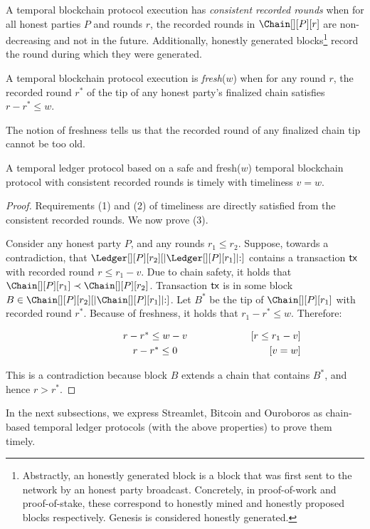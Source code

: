 \begin{definition}
  A temporal blockchain protocol execution has \emph{consistent recorded rounds}
  when for all honest parties $P$ and rounds $r$,
  the recorded rounds in $\Chain[][P][r]$ are non-decreasing and not
  in the future.
  Additionally, honestly generated blocks\footnote{
    Abstractly, an honestly generated block is a block that was first
    sent to the network by an honest party broadcast. Concretely, in proof-of-work
    and proof-of-stake, these correspond to honestly mined and honestly
    proposed blocks respectively. Genesis is considered honestly generated.
  } record the round during which
  they were generated.
\end{definition}

\begin{definition}[Freshness] \label{def:tip-freshness}
  A temporal blockchain protocol execution is \emph{fresh}($w$) when for
  any round $r$, the recorded round
  $r^*$ of the tip of any honest party's finalized chain
  satisfies $r - r^* \leq w$.
\end{definition}

The notion of freshness tells us that the recorded round
of any finalized chain tip cannot be too old.

\begin{theorem} \label{thm:freshness-to-timeliness}
  A temporal ledger protocol based on a safe and fresh($w$)
  temporal blockchain protocol with consistent recorded rounds is timely with timeliness $v = w$.
\end{theorem}
\begin{proof}
  Requirements (1) and (2) of timeliness are directly satisfied from
  the consistent recorded rounds.
  We now prove (3).

  Consider any honest party $P$, and any rounds $r_1 \leq r_2$.
  Suppose, towards a contradiction, that $\Ledger[][P][r_2][|\Ledger[][P][r_1]|{:}]$
  contains a transaction $\textsf{tx}$ with recorded round $r \leq r_1 - v$.
  Due to chain safety, it holds that $\Chain[][P][r_1] \prec \Chain[][P][r_2]$.
  Transaction $\textsf{tx}$ is in some block $B \in \Chain[][P][r_2][|\Chain[][P][r_1]|{:}]$.
  Let $B^*$ be the tip of $\Chain[][P][r_1]$ with recorded round $r^*$.
  Because of freshness, it holds that $r_1 - r^* \leq w$.
  Therefore:

  \begin{align*}
    \makebox[0.5\textwidth][c]{$r - r^* \leq w - v$}         && \text{[$r \leq r_1 - v$]} \\
    \makebox[0.5\textwidth][c]{$r - r^* \leq 0$}             && \text{[$v = w$]}
  \end{align*}

  This is a contradiction because block $B$ extends a chain that contains $B^*$,
  and hence $r > r^*$.
  \Qed
\end{proof}

In the next subsections, we express Streamlet, Bitcoin and Ouroboros
as chain-based temporal ledger protocols (with the above properties) to
prove them timely.
